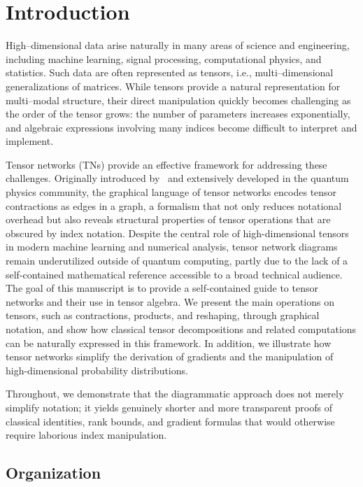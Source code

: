 \newpage
\section*{Introduction}
High–dimensional data arise naturally in many areas of science and engineering, including machine learning, signal processing, computational physics, and statistics. Such data are often represented as tensors, i.e., multi–dimensional generalizations of matrices. While tensors provide a natural representation for multi–modal structure, their direct manipulation quickly becomes challenging as the order of the tensor grows: the number of parameters increases exponentially, and algebraic expressions involving many indices become difficult to interpret and implement.

Tensor networks (TNs) provide an effective framework for addressing these challenges.
Originally introduced by~\cite{penrose1971applications} and extensively developed in the quantum physics community, the graphical language of tensor networks encodes tensor contractions as edges in a graph, a formalism that not only reduces notational overhead but also reveals structural properties of tensor operations that are obscured by index notation. Despite the central role of high-dimensional tensors in modern machine learning and numerical analysis, tensor network diagrams remain underutilized outside of quantum computing, partly due to the lack of a self-contained mathematical reference accessible to a broad technical audience.
The goal of this manuscript is to provide a self-contained guide to tensor networks and their use in tensor algebra. We present the main operations on tensors, such as contractions, products, and reshaping, through graphical notation, and show how classical tensor decompositions and related computations can be naturally expressed in this framework. In addition, we illustrate how tensor networks simplify the derivation of gradients and the manipulation of high-dimensional probability distributions.

Throughout, we demonstrate that the diagrammatic approach does not merely simplify notation; it yields genuinely shorter and more transparent proofs of classical identities, rank bounds, and gradient formulas that would otherwise require laborious index manipulation. 



\subsection*{Organization}

